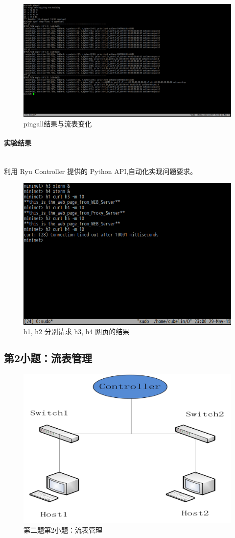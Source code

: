 \documentclass[format=draft,language=chinese,category=SDN]{hustreport}
\newcommand{\myparagraph}[1]{\paragraph{#1}\mbox{}\\}
\begin{document}
\begin{figure}[!h]
\centering
\includegraphics[width=\textwidth]{fig/2_1-2.png}
\caption{pingall结果与流表变化}\label{fig:Q2_1-2}
\end{figure}


\myparagraph{实验结果}

利用 Ryu Controller 提供的 Python API,自动化实现问题要求。

\begin{figure}[!h]
\centering
\includegraphics[width=.618\textwidth]{fig/2_1-3.png}
\caption{h1, h2 分别请求 h3, h4 网页的结果}\label{fig:Q2_1-3}
\end{figure}

\clearpage

\subsection{第2小题：流表管理}\label{sec:Q2_2}

\begin{figure}[!h]
\centering
\includegraphics[width=.618\textwidth]{fig/2_2-0.png}
\caption{第二题第2小题：流表管理}\label{fig:Q2_2-0}
\end{figure}
\end{document}
